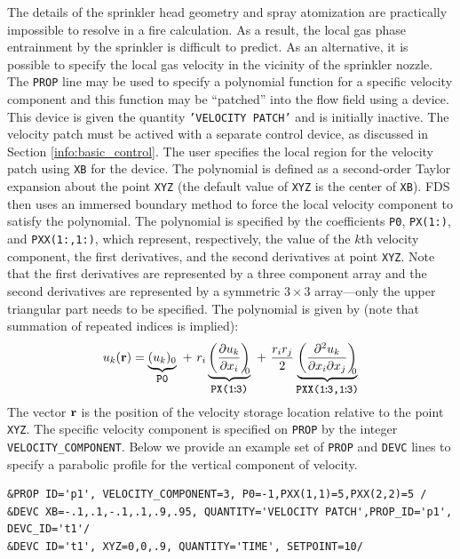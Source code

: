 \documentclass[11pt]{book}
\newcommand{\ct}{\tt\small}
\begin{document}
The details of the sprinkler head geometry and spray atomization are practically impossible to resolve in a fire calculation.  As a result, the local gas phase entrainment by the sprinkler is difficult to predict.  As an alternative, it is possible to specify the local gas velocity in the vicinity of the sprinkler nozzle.  The {\ct PROP} line may be used to specify a polynomial function for a specific velocity component and this function may be ``patched'' into the flow field using a device.  This device is given the quantity {\ct 'VELOCITY PATCH'} and is initially inactive.  The velocity patch must be actived with a separate control device, as discussed in Section \ref{info:basic_control}.  The user specifies the local region for the velocity patch using {\ct XB} for the device.  The polynomial is defined as a second-order Taylor expansion about the point {\ct XYZ} (the default value of {\ct XYZ} is the center of {\ct XB}).  FDS then uses an immersed boundary method to force the local velocity component to satisfy the polynomial.  The polynomial is specified by the coefficients {\ct P0}, {\ct PX(1\!:)}, and {\ct PXX(1\!:,1\!:)}, which represent, respectively, the value of the $k$th velocity component, the first derivatives, and the second derivatives at point {\ct XYZ}.  Note that the first derivatives are represented by a three component array and the second derivatives are represented by a symmetric $3 \times 3$ array---only the upper triangular part needs to be specified.  The polynomial is given by (note that summation of repeated indices is implied):
\begin{equation}
u_k(\mathbf{r}) = \underbrace{(u_k)_0}_{\mbox{\ct P0}} \,\,+\,\, r_i \underbrace{\left( \frac{\partial u_k}{\partial x_i} \right)_{\!\!\!0}}_{\mbox{\ct PX(1\!:\!3)}} \,\,+\,\,\frac{ r_i r_j}{2} \underbrace{\left(\frac{\partial^2 u_k}{\partial x_i \partial x_j}\right)_{\!\!\!0}}_{\mbox{\ct PXX(1\!:\!3,1\!:\!3)}}
\end{equation}
The vector ${\bf r}$ is the position of the velocity storage location relative to the point {\ct XYZ}.  The specific velocity component is specified on {\ct PROP} by the integer {\ct VELOCITY\_COMPONENT}.  Below we provide an example set of {\ct PROP} and {\ct DEVC} lines to specify a parabolic profile for the vertical component of velocity.

\footnotesize
\begin{verbatim}
&PROP ID='p1', VELOCITY_COMPONENT=3, P0=-1,PXX(1,1)=5,PXX(2,2)=5 /
&DEVC XB=-.1,.1,-.1,.1,.9,.95, QUANTITY='VELOCITY PATCH',PROP_ID='p1', DEVC_ID='t1'/
&DEVC ID='t1', XYZ=0,0,.9, QUANTITY='TIME', SETPOINT=10/
\end{verbatim}
\end{document}
